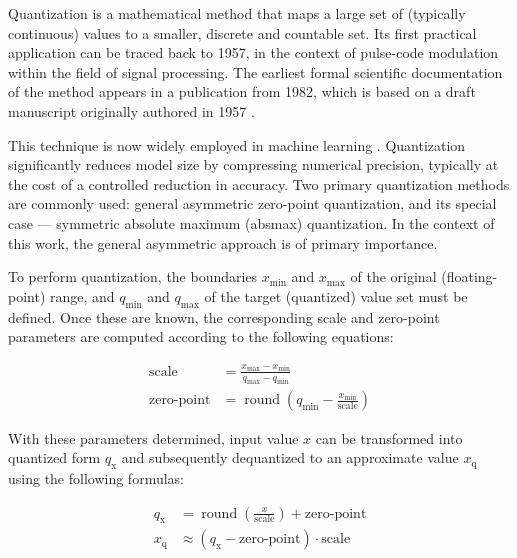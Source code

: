 {Quantization is a mathematical method that maps a large set of (typically continuous) values to a smaller, discrete and countable set.
Its first practical application can be traced back to 1957, in the context of pulse-code modulation within the field of signal processing.
The earliest formal scientific documentation of the method appears in a publication from 1982,
which is based on a draft manuscript originally authored in 1957 \cite{firstQuantization}.

This technique is now widely employed in machine learning \cite{MLQuantization1, MLQuantization2, quantnnwhite}.
Quantization significantly reduces model size \cite{quantcompression} by compressing numerical precision, typically at the cost of a controlled reduction in accuracy.
Two primary quantization methods are commonly used: general asymmetric zero-point quantization, and its special case ---
symmetric absolute maximum (absmax) quantization.
In the context of this work, the general asymmetric approach is of primary importance.

To perform quantization, the boundaries \( x_{\text{min}} \) and \( x_{\text{max}} \) of the original (floating-point) range,
and \( q_{\text{min}} \) and \( q_{\text{max}} \) of the target (quantized) value set must be defined.
Once these are known, the corresponding scale and zero-point parameters are computed according to the following equations:

\clearpage
\begingroup
\setlength{\jot}{8pt} %
\begin{align}
\text{scale} &= \frac{x_{\text{max}} - x_{\text{min}}}{q_{\text{max}} - q_{\text{min}}} \label{eq:scale}\\[-2pt]
\text{zero-point} &= \operatorname{round}\!\left( q_{\text{min}} - \frac{x_{\text{min}}}{\text{scale}} \right) \label{eq:zeropoint}
\end{align}
\endgroup

With these parameters determined,
input value \( x \) can be transformed into quantized form \( q_{\text{x}} \) and subsequently dequantized to an approximate value \( x_{\text{q}} \) using the following formulas:

\begingroup
\setlength{\jot}{8pt} %
\begin{align}
q_{\text{x}} &= \operatorname{round}\!\left(\frac{x}{\text{scale}}\right) + \text{zero-point} \label{eq:quantize}\\[-2pt]
x_{\text{q}} &\approx \left( q_{\text{x}} - \text{zero-point} \right)\cdot \text{scale} \label{eq:dequantize}
\end{align}
\endgroup

}
